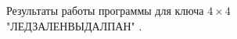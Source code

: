 \documentclass[a5paper, 10pt]{article}
\theoremstyle{definition}
\theoremstyle{plain}
\theoremstyle{remark}
\begin{document}
\begin{figure}[h!]
\begin{minipage}[h!]{0.49\linewidth}
\end{minipage}
\caption{Результаты работы программы для ключа $4 \times 4$ "ЛЕДЗАЛЕНВЫДАЛПАН" .}
\label{ris:image1}
\end{figure}
\end{document}

